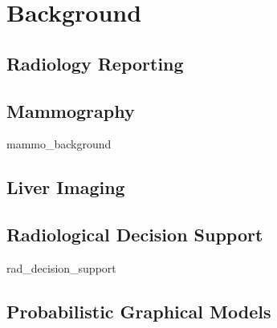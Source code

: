 \chapter{Background}

\section{Radiology Reporting}

\section{Mammography}
{mammo_background}

\section{Liver Imaging}

\section{Radiological Decision Support}
{rad_decision_support}

\section{Probabilistic Graphical Models}